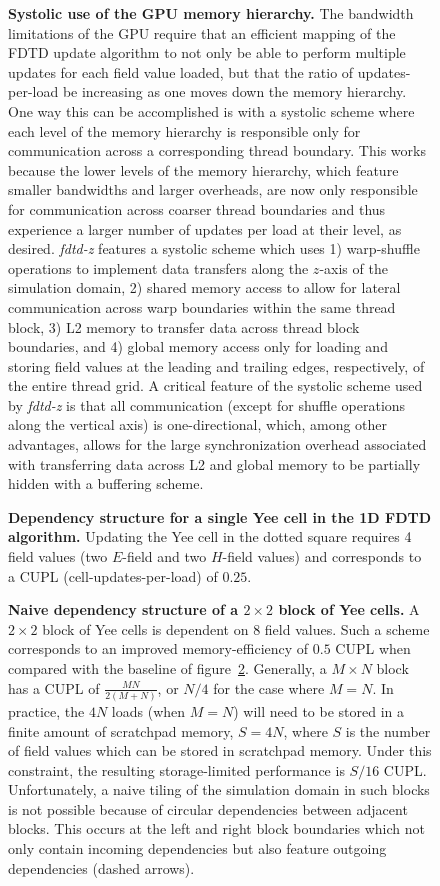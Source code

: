 \documentclass[12pt]{article}
\newcommand{\fdtdz}{\mbox{\emph{fdtd-z}}}  %
\newcommand{\myfig}[3]{
  \begin{figure}[bp]
		\begin{center}
			
      \caption{\textbf{#2}#3\label{fig:#1}}
		\end{center}
	\end{figure}
}
\begin{document}
\myfig{gpu-systolic}{Systolic use of the GPU memory hierarchy.}{
  The bandwidth limitations of the GPU
    require that an efficient mapping of the FDTD update algorithm
    to not only be able to perform multiple updates for each field value loaded,
    but that the ratio of updates-per-load be increasing
    as one moves down the memory hierarchy.
  One way this can be accomplished is with a systolic scheme
    where each level of the memory hierarchy is responsible only
    for communication across a corresponding thread boundary.
  This works because the lower levels of the memory hierarchy,
    which feature smaller bandwidths and larger overheads,
    are now only responsible for communication across coarser thread boundaries
    and thus experience a larger number of updates per load at their level,
    as desired.
  {\fdtdz} features a systolic scheme which uses
    1) warp-shuffle operations to implement
    data transfers along the $z$-axis of the simulation domain,
    2) shared memory access to allow for lateral communication
    across warp boundaries within the same thread block,
    3) L2 memory to transfer data across thread block boundaries, and
    4) global memory access only for loading and storing field values
    at the leading and trailing edges, respectively, of the entire thread grid.
  A critical feature of the systolic scheme used by {\fdtdz}
    is that all communication
    (except for shuffle operations along the vertical axis)
    is one-directional, which, among other advantages,
    allows for the large synchronization overhead associated
    with transferring data across L2 and global memory
    to be partially hidden with a buffering scheme.
}

\myfig{single-yee-cell}{
  Dependency structure for a single Yee cell in the 1D FDTD algorithm.}{
	Updating the Yee cell in the dotted square requires 4 field values
	  (two $E$-field and two $H$-field values)
	  and corresponds to a CUPL (cell-updates-per-load) of $0.25$.
}

\myfig{2x2-cell}{
  Naive dependency structure of a $2 \times 2$ block of Yee cells.}{
  A $2 \times 2$ block of Yee cells is dependent on 8 field values. 
	Such a scheme corresponds
	  to an improved memory-efficiency of $0.5$ CUPL when compared
	  with the baseline of figure~\ref{fig:single-yee-cell}.
	Generally, a $M\times N$ block has a CUPL of $\frac{MN}{2(M+N)}$,
	  or $N/4$ for the case where $M=N$.
	In practice, the $4N$ loads (when $M=N$) will need to be stored
	  in a finite amount of scratchpad memory, $S = 4N$,
	  where $S$ is the number of field values
	  which can be stored in scratchpad memory.
	Under this constraint,
    the resulting storage-limited performance is $S/16$ CUPL.
	Unfortunately, a naive tiling of the simulation domain in such blocks
	  is not possible
	  because of circular dependencies between adjacent blocks.
	This occurs at the left and right block boundaries
	  which not only contain incoming dependencies
	  but also feature outgoing dependencies (dashed arrows).
}
\end{document}
